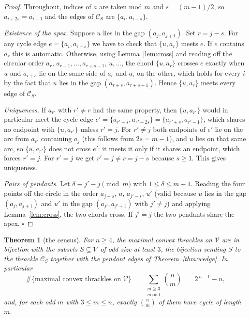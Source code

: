 \documentclass[11pt,a4paper]{article}
\newtheorem{theorem}{Theorem}[section]
\theoremstyle{definition}
\theoremstyle{plain}
\newcommand{\V}{\mathcal{V}}
\newcommand{\mc}{\mathcal{C}}
\begin{document}
\begin{proof}
Throughout, indices of $a$ are taken mod $m$ and $s=(m-1)/2$, so
$a_{i+2s}=a_{i-1}$ and the edges of $\mc_S$ are $\{a_i,a_{i+s}\}$.

\emph{Existence of the apex.}  Suppose $u$ lies in the gap $(a_j,a_{j+1})$.
Set $r=j-s$.  For any cycle edge $e=\{a_i,a_{i+s}\}$ we have to check that
$\{u,a_r\}$ meets $e$.  If $e$ contains $a_r$ this is automatic.  Otherwise,
using Lemma~\ref{lem:cross} and reading off the circular order
$a_r,\,a_{r+1},\dots,a_{r+s-1},\,u,\dots$, the chord $\{u,a_r\}$ crosses $e$
exactly when $u$ and $a_{i+s}$ lie on the same side of $a_r$ and $a_i$ on the
other, which holds for every $i$ by the fact that $u$ lies in the gap
$(a_{r+s},a_{r+s+1})$.  Hence $\{u,a_r\}$ meets every edge of $\mc_S$.

\emph{Uniqueness.}  If $a_{r'}$ with $r'\ne r$ had the same property, then
$\{u,a_{r'}\}$ would in particular meet the cycle edge
$e'=\{a_{r'+s},a_{r'+2s}\}=\{a_{r'+s},a_{r'-1}\}$, which shares no endpoint
with $\{u,a_{r'}\}$ unless $r'=j$.  For $r'\ne j$ both endpoints of $e'$ lie on
the arc from $a_{r'}$ containing $a_j$ (this follows from $2s=m-1$), and
$u$ lies on that same arc, so $\{u,a_{r'}\}$ does not cross $e'$: it meets it
only if it shares an endpoint, which forces $r'=j$.  For $r'=j$ we get
$r'=j\ne r=j-s$ because $s\ge1$.  This gives uniqueness.

\emph{Pairs of pendants.}  Let $\delta\equiv j'-j \pmod m$ with $1\le\delta\le
m-1$.  Reading the four points off the circle in the order
$a_{j-s},\,u,\,a_{j'-s},\,u'$ (valid because $u$ lies in the gap
$(a_j,a_{j+1})$ and $u'$ in the gap $(a_{j'},a_{j'+1})$ with $j'\ne j$) and
applying Lemma~\ref{lem:cross}, the two chords cross.  If $j'=j$ the two
pendants share the apex. \hfill\(\square\)
\end{proof}

\begin{theorem}[the census]\label{thm:census}
For $n\ge4$, the maximal convex thrackles on $\V$ are in bijection with the
subsets $S\subseteq\V$ of odd size at least $3$, the bijection sending $S$ to
the thrackle $\mc_S$ together with the pendant edges of
Theorem~\ref{thm:wedge}.  In particular
\begin{equation}\label{eq:count}
\#\{\text{maximal convex thrackles on }\V\}\;=\;\sum_{\substack{m\ge3\\ m\ \mathrm{odd}}}\binom nm
\;=\;2^{\,n-1}-n,\end{equation}
and, for each odd $m$ with $3\le m\le n$, exactly $\binom nm$ of them have
cycle of length $m$.
\end{theorem}
\end{document}
